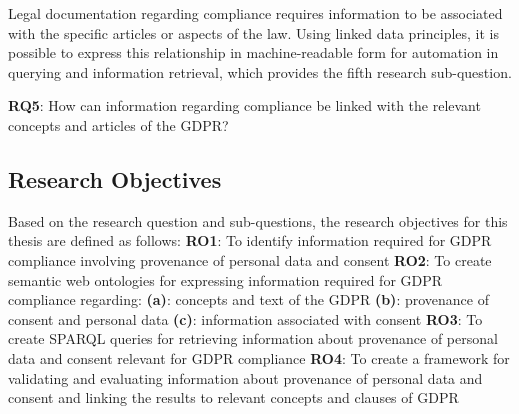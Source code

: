 Legal documentation regarding compliance requires information to be associated with the specific articles or aspects of the law. Using linked data principles, it is possible to express this relationship in machine-readable form for automation in querying and information retrieval, which provides the fifth research sub-question.
\begin{framed}
\textbf{RQ5}: How can information regarding compliance be linked with the relevant concepts and articles of the GDPR?
\end{framed}


\subsection{Research Objectives}\label{sec:intro-RO}
Based on the research question and sub-questions, the research objectives for this thesis are defined as follows:
\newline\noindent\textbf{RO1}: To identify information required for GDPR compliance involving provenance of personal data and consent
\newline\noindent\textbf{RO2}: To create semantic web ontologies for expressing information required for GDPR compliance regarding:
\newline\indent\indent\textbf{(a)}: concepts and text of the GDPR
\newline\indent\indent\textbf{(b)}: provenance of consent and personal data
\newline\indent\indent\textbf{(c)}: information associated with consent
\newline\noindent\textbf{RO3}: To create SPARQL queries for retrieving information about provenance of personal data and consent relevant for GDPR compliance
\newline\noindent\textbf{RO4}: To create a framework for validating and evaluating information about provenance of personal data and consent and linking the results to relevant concepts and clauses of GDPR



